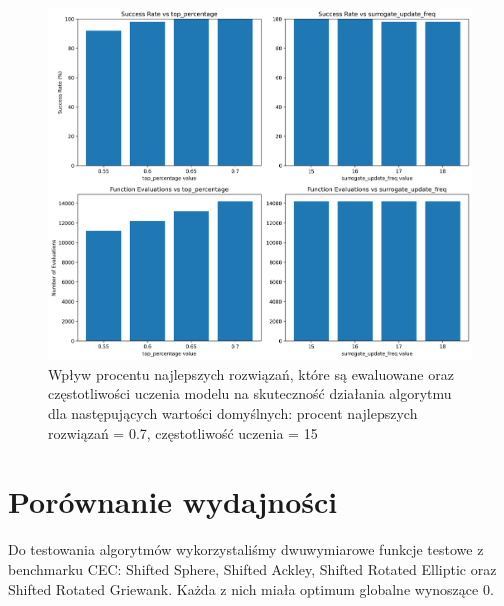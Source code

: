 \documentclass{article}
\begin{document}
\begin{figure}[H]
    \centering
    \includegraphics[width=\textwidth]{surrogate_de_parameter_tuning_results3.png}
    \caption{Wpływ procentu najlepszych rozwiązań, które są ewaluowane oraz częstotliwości uczenia modelu na skuteczność działania algorytmu dla następujących wartości domyślnych: procent najlepszych rozwiązań = 0.7, częstotliwość uczenia = 15}
    \label{fig:surogate_de_parameter_results3}
\end{figure}

\section{Porównanie wydajności}

Do testowania algorytmów wykorzystaliśmy dwuwymiarowe funkcje testowe z benchmarku CEC: Shifted Sphere, Shifted Ackley, Shifted Rotated Elliptic oraz Shifted Rotated Griewank. Każda z nich miała optimum globalne wynoszące 0.
\end{document}
